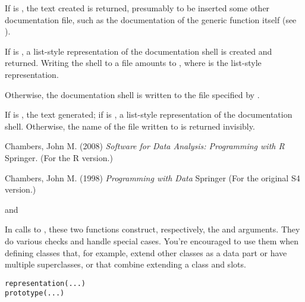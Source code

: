 %
\begin{Details}\relax
If  is , the text created is returned,
presumably to be inserted some other documentation file, such as the
documentation of the generic function itself (see
). 

If  is , a list-style representation of the
documentation shell is created and returned.  Writing the shell to a
file amounts to ,
where  is the list-style representation.

Otherwise, the documentation shell is written to the file specified by
.
\end{Details}
%
\begin{Value}
If  is , the text generated;
if  is , a list-style representation of the
documentation shell.
Otherwise, the name of the file written to is returned invisibly.
\end{Value}
%
\begin{References}\relax
Chambers, John M. (2008)
\emph{Software for Data Analysis: Programming with R}
Springer.  (For the R version.)

Chambers, John M. (1998)
\emph{Programming with Data}
Springer (For the original S4 version.)
\end{References}
%
\begin{SeeAlso}\relax
{} and
\end{SeeAlso}
%
\begin{Description}\relax
In calls to
, these two functions construct,
respectively, the  and 
arguments.  They do various checks and handle special cases.  You're
encouraged to use them when defining classes that, for
example, extend other classes as a data part or have multiple
superclasses, or that combine extending a class and slots.
\end{Description}
%
\begin{Usage}
\begin{verbatim}
representation(...)
prototype(...)
\end{verbatim}
\end{Usage}
